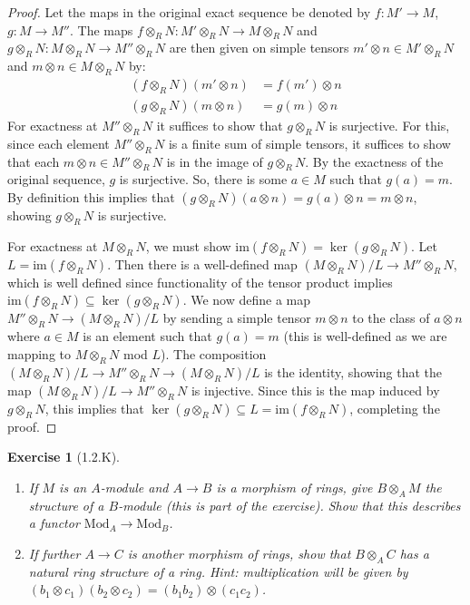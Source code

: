 \documentclass{amsart}
\newtheorem*{exercise*}{Exercise}
\begin{document}
\begin{proof}
		Let the maps in the original exact sequence be denoted by $f:M'\rightarrow M$, $g:M\rightarrow M''$. The maps $f\otimes_R N:M'\otimes_{R}N\rightarrow M\otimes_R N$ and $g\otimes_R N:M\otimes_R N\rightarrow M''\otimes_R N$ are then given on simple tensors $m'\otimes n\in M'\otimes_R N$ and $m\otimes n\in M\otimes_R N$ by:
    \begin{align*}
        (f\otimes_R N)(m'\otimes n) &= f(m')\otimes n \\
        (g\otimes_R N)(m\otimes n) &= g(m)\otimes n
    \end{align*}
    For exactness at $M''\otimes_R N$ it suffices to show that $g\otimes_R N$ is surjective. For this, since each element $M''\otimes_R N$ is a finite sum of simple tensors, it suffices to show that each $m\otimes n\in M''\otimes_R N$ is in the image of $g\otimes_R N$. By the exactness of the original sequence, $g$ is surjective. So, there is some $a\in M$ such that $g(a)=m$. By definition this implies that $(g\otimes_R N)(a\otimes n)=g(a)\otimes n=m\otimes n$, showing $g\otimes_R N$ is surjective. 

    \vspace{0.1in}

    For exactness at $M\otimes_R N$, we must show $\mathrm{im}(f\otimes_R N)=\ker(g\otimes_R N)$. Let $L=\mathrm{im}(f\otimes_R N)$. Then there is a well-defined map $(M\otimes_R N)/L\rightarrow M''\otimes_R N$, which is well defined since functionality of the tensor product implies $\mathrm{im}(f\otimes_R N)\subseteq \ker(g\otimes_R N)$. We now define a map $M''\otimes_R N\rightarrow (M\otimes_RN)/L$ by sending a simple tensor $m\otimes n$ to the class of $a\otimes n$ where $a\in M$ is an element such that $g(a)=m$ (this is well-defined as we are mapping to $M\otimes_R N$ mod $L$). The composition $(M\otimes_RN)/L\rightarrow M''\otimes_RN\rightarrow(M\otimes_RN)/L$ is the identity, showing that the map $(M\otimes_RN)/L\rightarrow M''\otimes_R N$ is injective. Since this is the map induced by $g\otimes_R N$, this implies that $\ker(g\otimes_R N)\subseteq L=\mathrm{im}(f\otimes_R N)$, completing the proof.  
\end{proof}

\vspace{0.1in}


\begin{exercise*}[1.2.K]
    \begin{enumerate}
        \item[(a)] If $M$ is an $A$-module and $A\rightarrow B$ is a morphism of rings, give $B\otimes_A M$ the structure of a $B$-module (this is part of the exercise). Show that this describes a functor $\mathrm{Mod}_A\rightarrow \mathrm{Mod}_B$.

        \item[(b)] If further $A\rightarrow C$ is another morphism of rings, show that $B\otimes_A C$ has a natural ring structure of a ring. Hint: multiplication will be given by $(b_1\otimes c_1)(b_2\otimes c_2)=(b_1b_2)\otimes(c_1c_2)$.
    \end{enumerate}
\end{exercise*}
\end{document}
